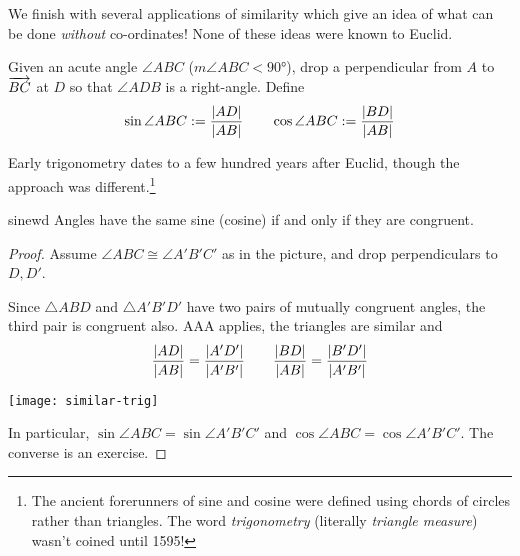 


\goodbreak




We finish with several applications of similarity which give an idea of what can be done \emph{without} co-ordinates! None of these ideas were known to Euclid.

\begin{defn}{}{}
Given an acute angle $\angle ABC$ ($m\angle ABC<\ang{90}$), drop a perpendicular from $A$ to $\overrightarrow{BC}$ at $D$ so that $\angle ADB$ is a right-angle. Define
\[\sin\angle ABC:=\frac{\left| AD\right|}{\left| AB\right|}\qquad \cos\angle ABC:=\frac{\left| BD\right|}{\left| AB\right|}\]
\end{defn}

Early trigonometry dates to a few hundred years after Euclid, though the approach was different.\footnote{The ancient forerunners of sine and cosine were defined using chords of circles rather than triangles. The word \emph{trigonometry} (literally \emph{triangle measure}) wasn't coined until 1595!}


\begin{thm}{}{sinewd}
Angles have the same sine (cosine) if and only if they are congruent.
\end{thm}


\begin{proof}
Assume $\angle ABC\cong\angle A'B'C'$ as in the picture, and drop perpendiculars to $D,D'$.\par
\begin{minipage}[t]{0.56\linewidth}\vspace{-8pt}
Since $\triangle ABD$ and $\triangle A'B'D'$ have two pairs of mutually congruent angles, the third pair is congruent also. AAA applies, the triangles are similar and
\[\frac{\left| AD\right|}{\left| AB\right|}=\frac{\left| A'D'\right|}{\left| A'B'\right|}\qquad \frac{\left| BD\right|}{\left| AB\right|}=\frac{\left| B'D'\right|}{\left| A'B'\right|}\]
\end{minipage}\hfill\begin{minipage}[t]{0.43\linewidth}\vspace{-8pt}
\flushright\texttt{[image: similar-trig]}
\end{minipage}\smallbreak
In particular, $\sin\angle ABC=\sin\angle A'B'C'$ and $\cos\angle ABC=\cos\angle A'B'C'$.\smallbreak
The converse is an exercise.
\end{proof}


